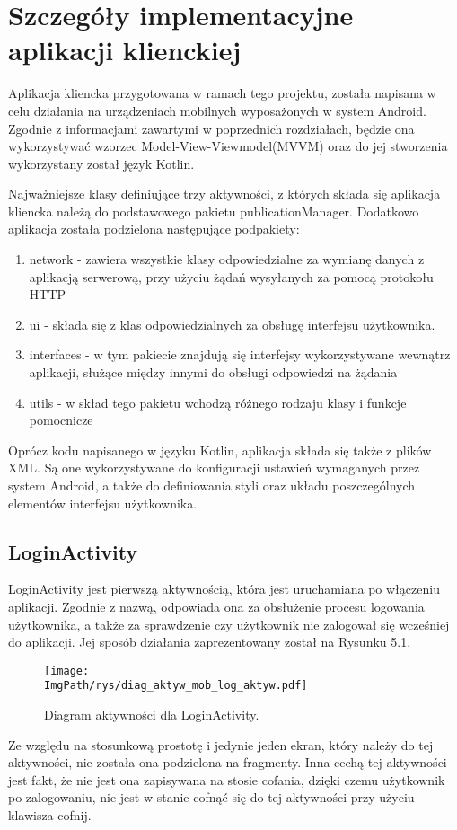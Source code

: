 \documentclass[a4paper,12pt,twoside,openany]{report}
\newcommand{\ImgPath}{.}
\begin{document}
\chapter{Szczegóły implementacyjne aplikacji klienckiej}

Aplikacja kliencka przygotowana w ramach tego projektu, została napisana w celu działania na urządzeniach mobilnych wyposażonych w system Android. Zgodnie z informacjami zawartymi w poprzednich rozdziałach, będzie ona wykorzystywać wzorzec Model-View-Viewmodel(MVVM) oraz do jej stworzenia wykorzystany został język Kotlin. 

Najważniejsze klasy definiujące trzy aktywności, z których składa się aplikacja kliencka należą do podstawowego pakietu publicationManager.
Dodatkowo aplikacja została podzielona następujące podpakiety:
\begin{enumerate}
 	\item network - zawiera wszystkie klasy odpowiedzialne za wymianę danych z aplikacją serwerową, przy użyciu żądań wysyłanych za pomocą protokołu HTTP
 	\item ui - składa się z klas odpowiedzialnych za obsługę interfejsu użytkownika.
 	\item interfaces - w tym pakiecie znajdują się interfejsy wykorzystywane wewnątrz aplikacji, służące między innymi do obsługi odpowiedzi na żądania
 	\item utils - w skład tego pakietu wchodzą różnego rodzaju klasy i funkcje pomocnicze
\end{enumerate}

Oprócz kodu napisanego w języku Kotlin, aplikacja składa się także z plików XML. Są one wykorzystywane do konfiguracji ustawień wymaganych przez system Android, a także do definiowania styli oraz układu poszczególnych elementów interfejsu użytkownika. 

\section{LoginActivity}
LoginActivity jest pierwszą aktywnością, która jest uruchamiana po włączeniu aplikacji. Zgodnie z nazwą, odpowiada ona za obsłużenie procesu logowania użytkownika, a także za sprawdzenie czy użytkownik nie zalogował się wcześniej do aplikacji. Jej sposób działania zaprezentowany został na Rysunku 5.1.
\begin{figure}[!htbp]
	\begin{center}
		\centering
		\texttt{[image: \\ImgPath/rys/diag\_aktyw\_mob\_log\_aktyw.pdf]}
	\end{center}
	\caption{Diagram aktywności dla LoginActivity.}
	\label{diagramAktywnosciLoginActivity}
\end{figure}
\pagebreak
Ze względu na stosunkową prostotę i jedynie jeden ekran, który należy do tej aktywności, nie została ona podzielona na fragmenty. Inna cechą tej aktywności jest fakt, że nie jest ona zapisywana na stosie cofania, dzięki czemu użytkownik po zalogowaniu, nie jest w stanie cofnąć się do tej aktywności przy użyciu klawisza cofnij.
\end{document}

